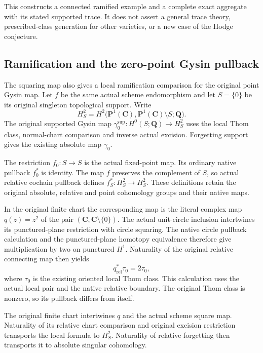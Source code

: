 \documentclass[11pt]{article}
\theoremstyle{definition}
\theoremstyle{remark}
\newcommand{\Q}{\mathbf Q}
\begin{document}
This constructs a connected ramified example and a complete exact
aggregate with its stated supported trace. It does not assert a general
trace theory, prescribed-class generation for other varieties, or a new
case of the Hodge conjecture.

\subsection{Ramification and the zero-point Gysin pullback}
\label{subsec:p1-square-ramification}

The squaring map also gives a local ramification comparison for the
original point Gysin map. Let \(f\) be the same actual scheme
endomorphism and let \(S=\{0\}\) be its original singleton topological
support. Write
\[
 H^2_S=H^2\bigl(\mathbf P^1(\mathbf C),
                    \mathbf P^1(\mathbf C)\setminus S;\Q\bigr).
\]
The original supported Gysin map
\(\gamma^{\mathrm{sup}}_0:H^0(S;\Q)\to H^2_S\) uses the local Thom class,
normal-chart comparison and inverse actual excision. Forgetting support
gives the existing absolute map \(\gamma_0\).

The restriction \(f_0:S\to S\) is the actual fixed-point map. Its
ordinary native pullback \(f_0^*\) is identity. The map \(f\) preserves
the complement of \(S\), so actual relative cochain pullback defines
\(f_S^*:H^2_S\to H^2_S\). These definitions retain the original
absolute, relative and point cohomology groups and their native maps.

In the original finite chart the corresponding map is the literal
complex map \(q(z)=z^2\) of the pair
\((\mathbf C,\mathbf C\setminus\{0\})\). The actual unit-circle
inclusion intertwines its punctured-plane restriction with circle
squaring. The native circle pullback calculation and the punctured-plane
homotopy equivalence therefore give multiplication by two on punctured
\(H^1\). Naturality of the original relative connecting map then yields
\[
 q^*_{\mathrm{rel}}\tau_0=2\tau_0,
\]
where \(\tau_0\) is the existing oriented local Thom class. This
calculation uses the actual local pair and the native relative boundary.
The original Thom class is nonzero, so its pullback differs from itself.

The original finite chart intertwines \(q\) and the actual scheme
square map. Naturality of its relative chart comparison and original
excision restriction transports the local formula to \(H^2_S\).
Naturality of relative forgetting then transports it to absolute
singular cohomology.
\end{document}
